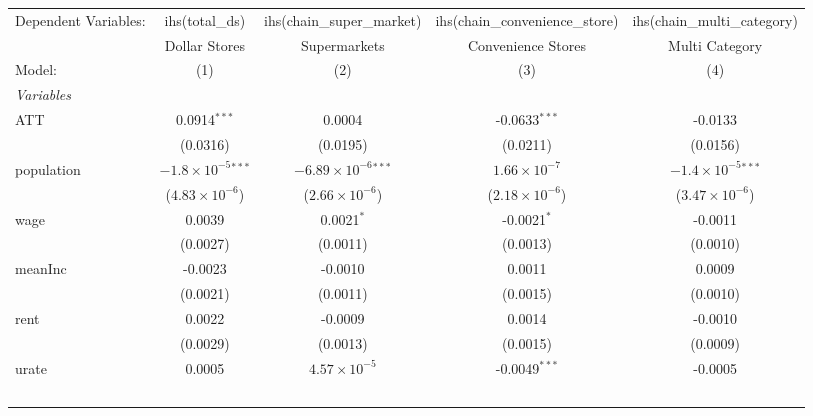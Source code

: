 \begingroup
\centering
\begin{tabular}{lcccc}
   \tabularnewline \midrule \midrule
   Dependent Variables: & ihs(total\_ds)                & ihs(chain\_super\_market)      & ihs(chain\_convenience\_store)   & ihs(chain\_multi\_category)\\    
                        & Dollar Stores                 & Supermarkets                   & Convenience Stores               & Multi Category \\   
   Model:               & (1)                           & (2)                            & (3)                              & (4)\\  
   \midrule
   \emph{Variables}\\
   ATT                  & 0.0914$^{***}$                & 0.0004                         & -0.0633$^{***}$                  & -0.0133\\   
                        & (0.0316)                      & (0.0195)                       & (0.0211)                         & (0.0156)\\   
   population           & $-1.8\times 10^{-5}$$^{***}$  & $-6.89\times 10^{-6}$$^{***}$  & $1.66\times 10^{-7}$             & $-1.4\times 10^{-5}$$^{***}$\\    
                        & ($4.83\times 10^{-6}$)        & ($2.66\times 10^{-6}$)         & ($2.18\times 10^{-6}$)           & ($3.47\times 10^{-6}$)\\    
   wage                 & 0.0039                        & 0.0021$^{*}$                   & -0.0021$^{*}$                    & -0.0011\\   
                        & (0.0027)                      & (0.0011)                       & (0.0013)                         & (0.0010)\\   
   meanInc              & -0.0023                       & -0.0010                        & 0.0011                           & 0.0009\\   
                        & (0.0021)                      & (0.0011)                       & (0.0015)                         & (0.0010)\\   
   rent                 & 0.0022                        & -0.0009                        & 0.0014                           & -0.0010\\   
                        & (0.0029)                      & (0.0013)                       & (0.0015)                         & (0.0009)\\   
   urate                & 0.0005                        & $4.57\times 10^{-5}$           & -0.0049$^{***}$                  & -0.0005\\   
$$
\end{tabular}

